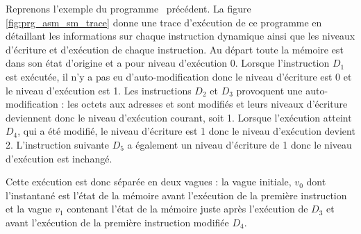 Reprenons l'exemple du programme \sm\ précédent.
La figure \ref{fig:prg_asm_sm_trace} donne une trace d'exécution de ce programme en détaillant les informations sur chaque instruction dynamique ainsi que les niveaux d'écriture et d'exécution de chaque instruction.
Au départ toute la mémoire est dans son état d'origine et a pour niveau d'exécution 0. Lorsque l'instruction $D_1$ est exécutée, il n'y a pas eu d'auto-modification donc le niveau d'écriture est 0 et le niveau d'exécution est 1.
Les instructions $D_2$ et $D_3$ provoquent une auto-modification : les octets aux adresses  et  sont modifiés et leurs niveaux d'écriture deviennent donc le niveau d'exécution courant, soit 1.
Lorsque l'exécution atteint $D_4$, qui a été modifié, le niveau d'écriture est 1 donc le niveau d'exécution devient 2.
L'instruction suivante $D_5$ a également un niveau d'écriture de 1 donc le niveau d'exécution est inchangé.

Cette exécution est donc séparée en deux vagues : la vague initiale, $v_0$ dont l'instantané est l'état de la mémoire avant l'exécution de la première instruction et la vague $v_1$ contenant l'état de la mémoire juste après l'exécution de $D_3$ et avant l'exécution de la première instruction modifiée $D_4$.




